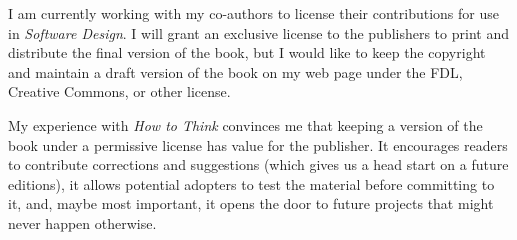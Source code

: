 \documentclass{article}
\begin{document}
I am currently working with my co-authors to license their
contributions for use in {\em Software Design}.  I will grant an
exclusive license to the publishers to print and distribute the final
version of the book, but I would like to keep the copyright and
maintain a draft version of the book on my web page under the FDL,
Creative Commons, or other license.


My experience with {\em How to Think} convinces me that keeping a
version of the book under a permissive license has value for the
publisher.  It encourages readers to contribute corrections and
suggestions (which gives us a head start on a future editions), it
allows potential adopters to test the material before committing to
it, and, maybe most important, it opens the door to future projects
that might never happen otherwise.
\end{document}
